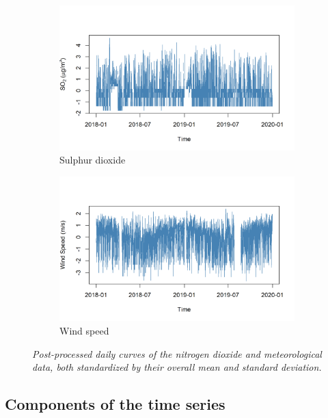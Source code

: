 \documentclass[a4paper, 10pt]{article}
\begin{document}
\begin{flushleft}
\begin{figure}[H]
         \begin{subfigure}{0.48\linewidth}
            \centering
            \includegraphics[width=\linewidth]{../img/transformed_so2.png}
         \caption{Sulphur dioxide}
         \end{subfigure}
         \hfill
         \begin{subfigure}{0.48\linewidth}
            \centering
            \includegraphics[width=\linewidth]{../img/transformed_speed.png}
            \caption{Wind speed}
         \end{subfigure}

         \caption{\textit{Post-processed daily curves of the nitrogen dioxide and meteorological data, both standardized by their overall mean and standard deviation.}}
      \end{figure}

      \subsection*{Components of the time series}     


\end{flushleft}
\end{document}
